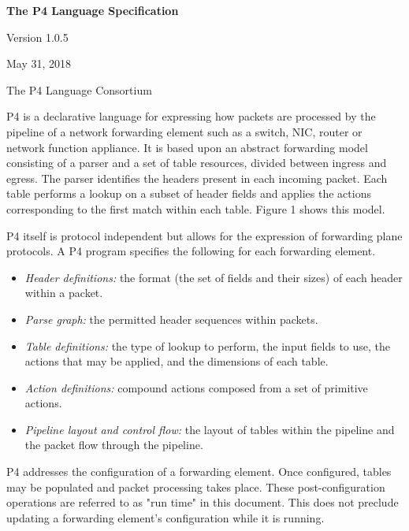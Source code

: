 \documentclass[12pt]{article}
\begin{document}
\vspace{2cm}

\centerline{\sffamily\bfseries\huge The P4 Language Specification}
\vspace{3mm}
\centerline{\sffamily\Large Version 1.0.5}
\vspace{3mm}
\centerline{\sffamily\large May 31, 2018}
\vspace{8mm}
\centerline{\sffamily\large The P4 Language Consortium}

\date{MM DD, YYYY}
\thispagestyle{firstpagestyle}


P4 is a declarative language for expressing how packets are processed by the 
pipeline of a network forwarding element such as a switch, NIC, router or 
network function appliance. It is based upon an abstract forwarding model 
consisting of a parser and a set of \matchaction table resources, divided 
between ingress and egress. The parser identifies the headers present in 
each incoming packet. Each \matchaction table performs a lookup on a subset 
of header fields and applies the actions corresponding to the first match 
within each table. Figure 1 shows this model.

P4 itself is protocol independent but allows for the expression of forwarding 
plane protocols. A P4 program specifies the following for each forwarding 
element.

\begin{itemize}
\item
\textit{Header definitions:} the format (the set of fields and their
sizes) of each header within a packet.
\item
\textit{Parse graph:} the permitted header sequences within packets.
\item
\textit{Table definitions:} the type of lookup to perform, the input
fields to use, the actions that may be applied, and the dimensions of
each table.
\item
\textit{Action definitions:} compound actions composed from a set of
primitive actions.
\item
\textit{Pipeline layout and control flow:} the layout of tables within
the pipeline and the packet flow through the pipeline.
\end{itemize}


P4 addresses the configuration of a forwarding element. Once configured, tables 
may be populated and packet processing takes place. These post-configuration 
operations are referred to as "run time" in this document. This does not preclude 
updating a forwarding element's configuration while it is running.
\end{document}
